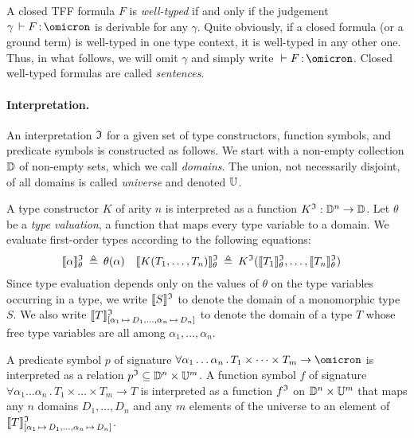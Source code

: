 A closed TFF formula $F$ is {\em well-typed\/} if and only if
the judgement $\gamma\, \vdash F \ty \omicron$ is derivable
for any $\gamma$.
Quite obviously, if a closed formula (or a ground term) is
well-typed in one type context, it is well-typed in any other one.
Thus, in what follows, we will omit $\gamma$ and simply write
${} \vdash F \ty \omicron$.
Closed well-typed formulas are called {\em sentences}.

\paragraph{Interpretation.}
An interpretation $\mathfrak{I}$ for a given set of type constructors,
function symbols, and predicate symbols is constructed as follows.
We start with a non-empty collection $\mathbb{D}$ of non-empty sets,
which we call {\em domains}. The union, not necessarily disjoint,
of all domains is called {\em universe\/} and denoted $\mathbb{U}$.

A type constructor $K$ of arity $n$ is interpreted as a function
$K^{\mathfrak{I}} : \mathbb{D}^n \to \mathbb{D}$.
Let $\theta$ be a {\em type valuation}, a function that maps every
type variable to a domain. We evaluate first-order types according
to the following equations:
\begin{align*}
\llbracket\alpha\rrbracket^{\mathfrak{I}}_{\theta} &\:\triangleq\: \theta(\alpha) &
\llbracket K(T_1,\dots,T_n)\rrbracket^{\mathfrak{I}}_{\theta} &\:\triangleq\: K^{\mathfrak{I}}(\llbracket T_1\rrbracket^{\mathfrak{I}}_{\theta},\dots,\llbracket T_n\rrbracket^{\mathfrak{I}}_{\theta})
\end{align*}
Since type evaluation depends only on the values of $\theta$
on the type variables occurring in a type, we write $\llbracket S\rrbracket^{\mathfrak{I}}$
to denote the domain of a monomorphic type $S$. We also write
$\llbracket T\rrbracket^{\mathfrak{I}}_{[\alpha_1\,\mapsto\,D_1,\dots,\alpha_n\,\mapsto\,D_n]}$
to denote the domain of a type $T$ whose free type variables
are all among $\alpha_1,\dots,\alpha_n$.

A predicate symbol $p$ of signature
$\forall \alpha_1\dots\alpha_n \,.\, T_1 \times \dots \times T_m
\to \omicron$ is interpreted as a relation
$p^{\mathfrak{I}} \subseteq \mathbb{D}^n \times \mathbb{U}^m$.
A function symbol $f$ of signature
$\forall \alpha_1\dots\alpha_n \,.\, T_1 \times \dots \times T_m \to T$
is interpreted as a function
$f^{\mathfrak{I}}$ on $\mathbb{D}^n \times \mathbb{U}^m$ that
maps any $n$ domains $D_1,\dots,D_n$ and
any $m$ elements of the universe
to an element of
$\llbracket T\rrbracket^{\mathfrak{I}}_{[\alpha_1\,\mapsto\,D_1,\dots,\alpha_n\,\mapsto\,D_n]}$.

